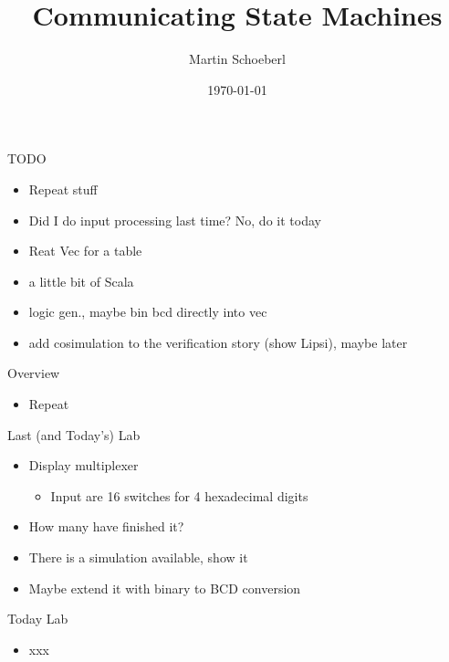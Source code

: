 

\newif\ifbook


\title{Communicating State Machines}
\author{Martin Schoeberl}
\date{\today}



\begin{frame}
\titlepage
\end{frame}


\begin{frame}[fragile]{TODO}
\begin{itemize}
\item Repeat stuff
\item Did I do input processing last time? No, do it today
\item Reat Vec for a table
\item a little bit of Scala
\item logic gen., maybe bin bcd directly into vec
\item add cosimulation to the verification story (show Lipsi), maybe later
\end{itemize}
\end{frame}

\begin{frame}[fragile]{Overview}
\begin{itemize}
\item Repeat
\end{itemize}
\end{frame}

\begin{frame}[fragile]{Last (and Today's) Lab}
\begin{itemize}
\item Display multiplexer
\begin{itemize}
\item Input are 16 switches for 4 hexadecimal digits
\end{itemize}
\item How many have finished it?
\item There is a simulation available, show it
\item Maybe extend it with binary to BCD conversion
\end{itemize}
\end{frame}


\begin{frame}[fragile]{Today Lab}
\begin{itemize}
\item xxx
\end{itemize}
\end{frame}

